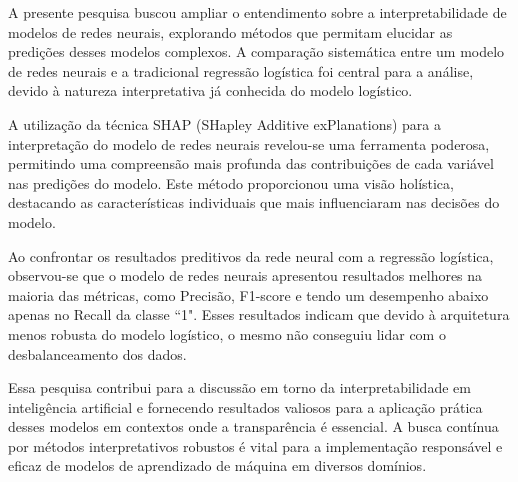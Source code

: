 A presente pesquisa buscou ampliar o entendimento sobre a interpretabilidade de modelos de redes neurais, 
explorando métodos que permitam elucidar as predições desses modelos complexos. A comparação sistemática 
entre um modelo de redes neurais e a tradicional regressão logística foi central para a análise, devido à natureza
interpretativa já conhecida do modelo logístico.

A utilização da técnica SHAP (SHapley Additive exPlanations) para a interpretação do modelo de redes neurais 
revelou-se uma ferramenta poderosa, permitindo uma compreensão mais profunda das contribuições de cada variável
nas predições do modelo. Este método proporcionou uma visão holística, destacando as características individuais
que mais influenciaram nas decisões do modelo.

Ao confrontar os resultados preditivos da rede neural com a regressão logística, observou-se que o modelo de redes neurais
apresentou resultados melhores na maioria das métricas, como Precisão, F1-score e tendo um desempenho abaixo apenas no Recall da
classe ``1". Esses resultados indicam que devido à arquitetura menos robusta do modelo logístico, o mesmo não conseguiu lidar
com o desbalanceamento dos dados.

Essa pesquisa contribui para a discussão em torno da interpretabilidade em inteligência
artificial e fornecendo resultados valiosos para a aplicação prática desses modelos em contextos onde a transparência é 
essencial. A busca contínua por métodos interpretativos robustos é vital para a implementação responsável e eficaz 
de modelos de aprendizado de máquina em diversos domínios.